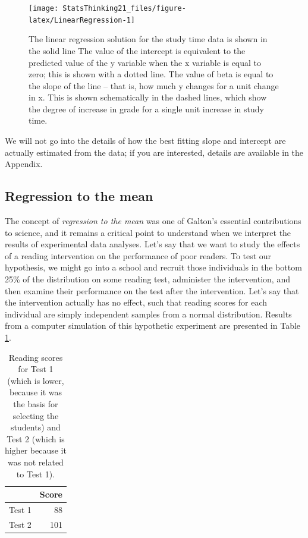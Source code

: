 \documentclass[
  12pt,
]{book}
\begin{document}
\begin{figure}
\texttt{[image: StatsThinking21\_files/figure-latex/LinearRegression-1]} \caption{The linear regression solution for the study time data is shown in the solid line The value of the intercept is equivalent to the predicted value of the y variable when the x variable is equal to zero; this is shown with a dotted line.  The value of beta is equal to the slope of the line -- that is, how much y changes for a unit change in x.  This is shown schematically in the dashed lines, which show the degree of increase in grade for a single unit increase in study time.}\label{fig:LinearRegression}
\end{figure}

We will not go into the details of how the best fitting slope and intercept are actually estimated from the data; if you are interested, details are available in the Appendix.

\hypertarget{regression-to-the-mean}{%
\subsection{Regression to the mean}\label{regression-to-the-mean}}

The concept of \emph{regression to the mean} was one of Galton's essential contributions to science, and it remains a critical point to understand when we interpret the results of experimental data analyses. Let's say that we want to study the effects of a reading intervention on the performance of poor readers. To test our hypothesis, we might go into a school and recruit those individuals in the bottom 25\% of the distribution on some reading test, administer the intervention, and then examine their performance on the test after the intervention. Let's say that the intervention actually has no effect, such that reading scores for each individual are simply independent samples from a normal distribution. Results from a computer simulation of this hypothetic experiment are presented in Table \ref{tab:readingTable}.

\begin{table}

\caption{\label{tab:readingTable}Reading scores for Test 1 (which is lower, because it was the basis for selecting the students) and Test 2 (which is higher because it was not related to Test 1).}
\centering
\begin{tabular}[t]{l|r}
\hline
  & Score\\
\hline
Test 1 & 88\\
\hline
Test 2 & 101\\
\hline
\end{tabular}
\end{table}
\end{document}
